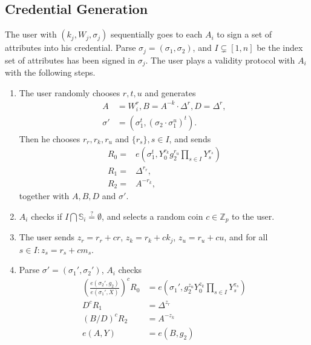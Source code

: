 \documentclass[journal]{IEEEtran}
\begin{document}
	\subsection{Credential Generation}
	
	The user with $(k_j, W_j, \sigma_j)$ sequentially goes to each $A_i$ to sign a set of attributes into his credential. Parse $\sigma_j = (\sigma_1, \sigma_2)$, and $I\subsetneq [1, n]$ be the index set of attributes has been signed in $\sigma_j$. The user plays a validity protocol with $A_i$ with the following steps.
	\begin{enumerate}
		\item The user randomly chooses $r, t, u$ and generates 
		\begin{align}\label{eq:blindcred}
		A &= W_i^r, B = A^{-k}\cdot \Delta^r, D =\Delta^r,\\ 
		\sigma' &= (\sigma_1^t,(\sigma_2\cdot \sigma_1^u)^t).\nonumber
		\end{align} 
		Then he chooses $r_r, r_k, r_u$ and $\{r_s\}, s\in I$, 
		and sends 
		\begin{align}
		R_0 =& e(\sigma_1^t, Y_0^{r_k}g_2^{r_u}\prod_{s \in I} Y_s^{r_s}) \\
		R_1 =& \Delta^{r_r},\\
		R_2 =& A ^{-r_k},
		\end{align}
		together with $A, B, D$ and $\sigma'$.
		\item $A_i$ checks if $I\bigcap \mathbb{S}_i \overset{?}{=} \emptyset$, and selects a random coin $c\in \mathbb{Z}_p$ to the user.
		\item The user sends $z_r = r_r + cr$, $z_k = r_k + ck_j$, $z_u = r_u + cu$, and for all $s\in I: z_s = r_s + c m_s$. 
		\item Parse $\sigma' = (\sigma_1', \sigma_2')$, $A_i$ checks 
		\begin{align}
		(\frac{e(\sigma_2', g_2)}{e(\sigma_1', X)})^c R_0 & = e(\sigma_1', g_2^{z_u}Y_0^{z_k}\prod_{s \in I}Y_s^{z_s})\\
		D^c R_1 & = \Delta^{z_r} \\
		(B/D)^c R_2 & = A^{-z_k} \\
		e(A, Y) &= e(B, g_2) 
		\end{align}
	\end{enumerate}
\end{document}
